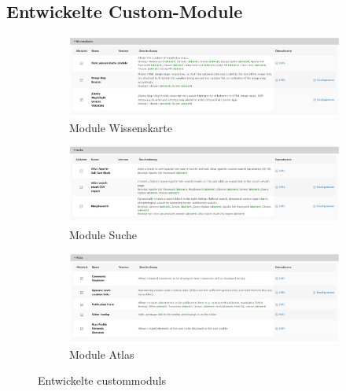 \subsection{Entwickelte Custom-Module}\label{sub:custom_modules}
\vspace{-1em}
\begin{figure}[H]
	\centering
	\begin{subfigure}[b]{0.48\textwidth}
		\centering
		\includegraphics[width=\linewidth]{images/modules_knowledgemap}
		\caption{Module Wissenskarte}
		\label{fig:modules_knowledgemap}
	\end{subfigure}
	\begin{subfigure}[b]{0.48\textwidth}
		\centering
		\includegraphics[width=\linewidth]{images/modules_search}
		\caption{Module Suche}
		\label{fig:modules_search}
	\end{subfigure}
	\begin{subfigure}[b]{0.48\textwidth}
		\centering
		\includegraphics[width=\linewidth]{images/modules_atlas}
		\caption{Module Atlas}
		\label{fig:modules_atlas}
	\end{subfigure}
	\caption{Entwickelte \glspl{custommodul}}
	\label{fig:modules_all}
\end{figure}
\vspace{-1em}


